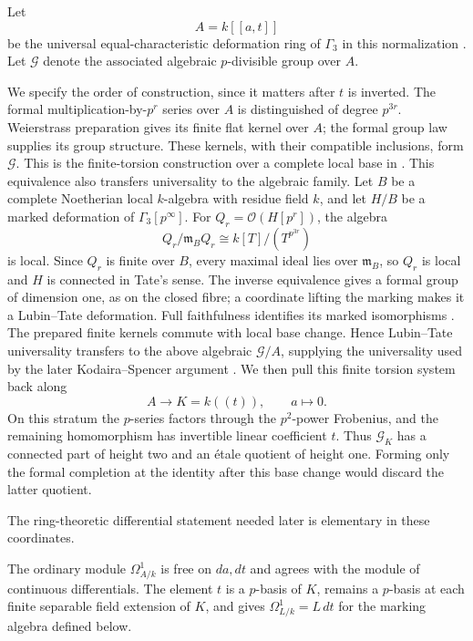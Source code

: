 Let
\[
                    A=k[[a,t]]
\]
be the universal equal-characteristic deformation ring of
\(\Gamma_3\) in this normalization \citep[Theorem~3.1]{LT66}.
Let \(\mathcal G\) denote the associated algebraic \(p\)-divisible
group over \(A\).

We specify the order of construction, since it matters after \(t\)
is inverted. The formal multiplication-by-\(p^r\) series over \(A\)
is distinguished of degree \(p^{3r}\).
Weierstrass preparation gives its finite flat kernel over \(A\);
the formal group law supplies its group structure. These kernels,
with their compatible inclusions, form \(\mathcal G\).
This is the finite-torsion construction over a complete local base in
\citet[Section~2.2, Proposition~1]{Tate67}.
This equivalence also transfers universality to the algebraic family.
Let \(B\) be a complete Noetherian local \(k\)-algebra with residue field
\(k\), and let \(H/B\) be a marked deformation of
\(\Gamma_3[p^\infty]\). For \(Q_r=\mathcal O(H[p^r])\), the algebra
\[
 Q_r/\mathfrak m_BQ_r\cong k[T]/(T^{p^{3r}})
\]
is local. Since \(Q_r\) is finite over \(B\), every maximal ideal lies
over \(\mathfrak m_B\), so \(Q_r\) is local and \(H\) is connected in
Tate's sense. The inverse equivalence gives a formal group of dimension
one, as on the closed fibre; a coordinate lifting the marking makes it
a Lubin--Tate deformation. Full faithfulness identifies its marked isomorphisms
\citep[Section~2.2, Proposition~1, and Section~2.3]{Tate67}.
The prepared finite kernels commute with local base change. Hence
Lubin--Tate universality transfers to the above algebraic
\(\mathcal G/A\), supplying the universality used by the later
Kodaira--Spencer argument \citep[Theorem~3.1 and paragraph~3.2]{LT66}.
We then pull this finite torsion system back along
\[
                    A\longrightarrow K=k((t)),\qquad a\longmapsto0.
\]
On this stratum the \(p\)-series factors through the
\(p^2\)-power Frobenius, and the remaining homomorphism has invertible
linear coefficient \(t\). Thus \(\mathcal G_K\) has a connected
part of height two and an \'etale quotient of height one.
Forming only the formal completion at the identity after this base
change would discard the latter quotient.

The ring-theoretic differential statement needed later is elementary
in these coordinates.

\begin{lemma}\label{lem:finite-p-basis}
The ordinary module \(\Omega^1_{A/k}\) is free on \(da,dt\) and agrees
with the module of continuous differentials.
The element \(t\) is a \(p\)-basis of \(K\), remains a \(p\)-basis at
each finite separable field extension of \(K\), and gives
\(\Omega^1_{L/k}=L\,dt\) for the marking algebra defined below.
\end{lemma}

